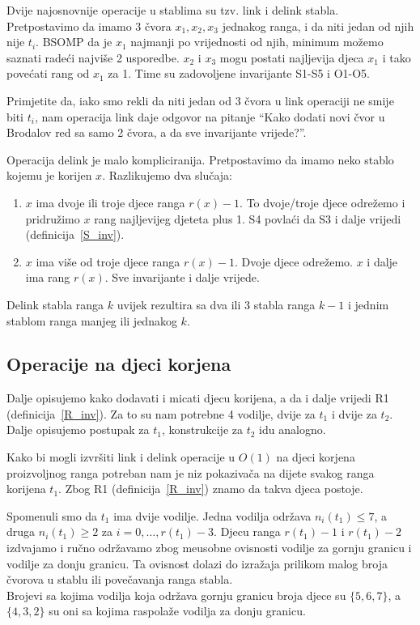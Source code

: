 Dvije najosnovnije operacije u stablima su tzv. link i delink stabla.
Pretpostavimo da imamo 3 \v{c}vora $x_{1}, x_{2}, x_{3}$ jednakog ranga, i da niti jedan od njih nije $t_{i}$.
BSOMP da je $x_{1}$ najmanji po vrijednosti od njih, minimum mo\v{z}emo saznati rade\'{c}i najvi\v{s}e 2 usporedbe.
$x_{2}$ i $x_{3}$ mogu postati najljevija djeca $x_{1}$ i tako pove\'{c}ati rang od $x_{1}$ za 1.
Time su zadovoljene invarijante S1-S5 i O1-O5.

Primjetite da, iako smo rekli da niti jedan od 3 \v{c}vora u link operaciji ne smije biti $t_{i}$, nam operacija link daje odgovor na pitanje ``Kako dodati novi \v{c}vor u Brodalov red sa samo 2 \v{c}vora, a da sve invarijante vrijede?''.

Operacija delink je malo kompliciranija. Pretpostavimo da imamo neko stablo kojemu je korijen $x$. Razlikujemo dva slu\v{c}aja:
\begin{enumerate}
  \item $x$ ima dvoje ili troje djece ranga $r(x) - 1$. To dvoje/troje djece odre\v{z}emo i pridru\v{z}imo $x$ rang najljevijeg djeteta plus 1. S4 povla\'{c}i da S3 i dalje vrijedi (definicija~\ref{S_inv}).
  \item $x$ ima vi\v{s}e od troje djece ranga $r(x) - 1$. Dvoje djece odre\v{z}emo. $x$ i dalje ima rang $r(x)$. Sve invarijante i dalje vrijede.
\end{enumerate}
Delink stabla ranga $k$ uvijek rezultira sa dva ili 3 stabla ranga $k - 1$ i jednim stablom ranga manjeg ili jednakog $k$.

\subsection{Operacije na djeci korjena}\label{insert_cut}

Dalje opisujemo kako dodavati i micati djecu korijena, a da i dalje vrijedi R1 (definicija~\ref{R_inv}).
Za to su nam potrebne 4 vodilje, dvije za $t_{1}$ i dvije za $t_{2}$.
Dalje opisujemo postupak za $t_{1}$, konstrukcije za $t_{2}$ idu analogno.

Kako bi mogli izvr\v{s}iti link i delink operacije u $O(1)$ na djeci korjena proizvoljnog ranga potreban nam je niz pokaziva\v{c}a na dijete svakog ranga korijena $t_{1}$.
Zbog R1 (definicija~\ref{R_inv}) znamo da takva djeca postoje.

Spomenuli smo da $t_{1}$ ima dvije vodilje. Jedna vodilja odr\v{z}ava $n_{i}(t_{1}) \le 7$, a druga $n_{i}(t_{1}) \ge 2$ za $i = 0,\dotsc,r(t_{1}) - 3$.
Djecu ranga $r(t_{1}) - 1$ i $r(t_{1}) - 2$ izdvajamo i ru\v{c}no odr\v{z}avamo zbog me\dj usobne ovisnosti vodilje za gornju granicu i vodilje za donju granicu.
Ta ovisnost dolazi do izra\v{z}aja prilikom malog broja \v{c}vorova u stablu ili pove\v{c}avanja ranga stabla.\\
Brojevi sa kojima vodilja koja odr\v{z}ava gornju granicu broja djece su $\{5,6,7\}$, a $\{4,3,2\}$ su oni sa kojima raspola\v{z}e vodilja za donju granicu.

